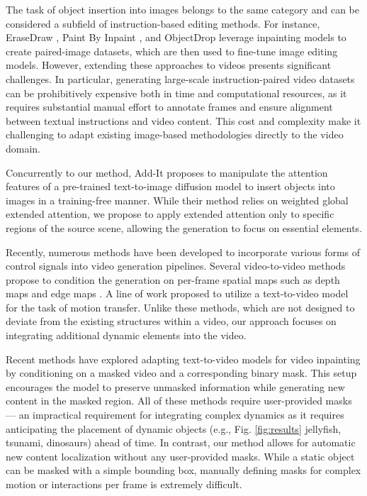 The task of object insertion into images belongs to the same category and can be considered a subfield of instruction-based editing methods. For instance, EraseDraw \cite{erasedraw-24}, Paint By Inpaint \cite{Wasserman2024PaintBI}, and ObjectDrop \cite{winter2024objectdrop} leverage inpainting models to create paired-image datasets, which are then used to fine-tune image editing models.  However, extending these approaches to videos presents significant challenges. In particular, generating large-scale instruction-paired video datasets can be prohibitively expensive both in time and computational resources, as it requires substantial manual effort to annotate frames and ensure alignment between textual instructions and video content. This cost and complexity make it challenging to adapt existing image-based methodologies directly to the video domain.

Concurrently to our method, Add-It \cite{Tewel2024AdditTO} proposes to manipulate the attention features of a pre-trained text-to-image diffusion model to insert objects into images in a training-free manner. While their method relies on weighted global extended attention, we propose to apply extended attention only to specific regions of the source scene, allowing the generation to focus on essential elements.



Recently, numerous methods have been developed to incorporate various forms of control signals into video generation pipelines.
Several video-to-video methods propose to condition the generation on per-frame spatial maps such as depth maps and edge maps \cite{Wang2023VideoComposerCV,Chen2023ControlAVideoCT}. A line of work \cite{yatim2023spacetime, zhao2023motiondirector, park2024spectral, jeong2023vmc, tokenflow2023} proposed to utilize a text-to-video model for the task of motion transfer. Unlike these methods, which are not designed to deviate from the existing structures within a video, our approach focuses on integrating additional dynamic elements into the video. 

Recent methods \cite{bartal2024lumiere,Ma2024VidPanosGP,Zhang2023AVIDAV,Zi2024CoCoCoIT, zhou2023propainter} have explored adapting text-to-video models for video inpainting by conditioning on a masked video and a corresponding binary mask. This setup encourages the model to preserve unmasked information while generating new content in the masked region. All of these methods require user-provided masks — an impractical requirement for integrating complex dynamics as it requires anticipating the placement of dynamic objects (e.g., Fig. \ref{fig:results} jellyfish, tsunami, dinosaurs) ahead of time. In contrast, our method allows for automatic new content localization without any user-provided masks. While a static object can be masked with a simple bounding box, manually defining masks for complex motion or interactions per frame is extremely difficult.

